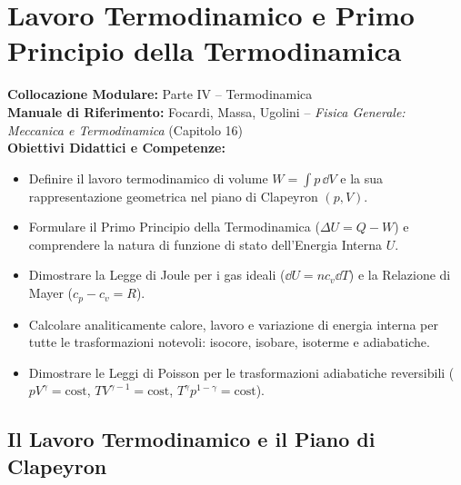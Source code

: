 \chapter{Lavoro Termodinamico e Primo Principio della Termodinamica}
\label{chap:primo_principio_trasformazioni}

\begin{tcolorbox}[enhanced, breakable, colback=navyblue!4!white, colframe=navyblue!80!black,
    coltitle=white, fonttitle=\bfseries\sffamily, title={Quadro Sinottico del Capitolo 14},
    sharp corners, rounded corners=south, boxrule=1pt]
\textbf{Collocazione Modulare:} Parte IV -- Termodinamica\\
\textbf{Manuale di Riferimento:} Focardi, Massa, Ugolini -- \emph{Fisica Generale: Meccanica e Termodinamica} (Capitolo 16)\\
\textbf{Obiettivi Didattici e Competenze:}\par
\begin{itemize}
    \item Definire il lavoro termodinamico di volume $W = \int p\,\dd V$ e la sua rappresentazione geometrica nel piano di Clapeyron $(p, V)$.
    \item Formulare il Primo Principio della Termodinamica ($\Delta U = Q - W$) e comprendere la natura di funzione di stato dell'Energia Interna $U$.
    \item Dimostrare la Legge di Joule per i gas ideali ($\dd U = n c_v \dd T$) e la Relazione di Mayer ($c_p - c_v = R$).
    \item Calcolare analiticamente calore, lavoro e variazione di energia interna per tutte le trasformazioni notevoli: isocore, isobare, isoterme e adiabatiche.
    \item Dimostrare le Leggi di Poisson per le trasformazioni adiabatiche reversibili ($p V^\gamma = \text{cost}$, $T V^{\gamma-1} = \text{cost}$, $T^\gamma p^{1-\gamma} = \text{cost}$).
\end{itemize}
\end{tcolorbox}

\vspace{0.5em}

\section{Il Lavoro Termodinamico e il Piano di Clapeyron}
\label{sec:lavoro_termodinamico}

